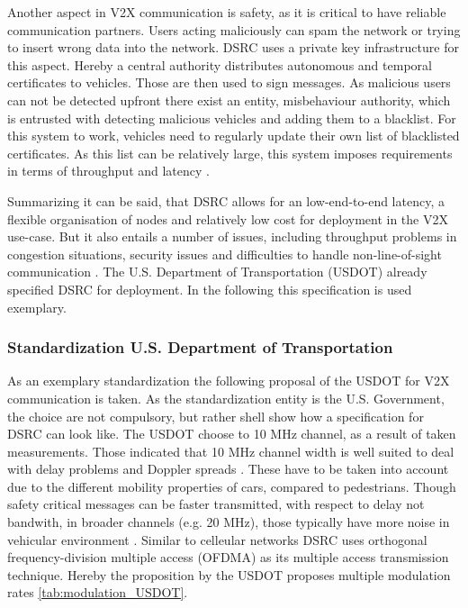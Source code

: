 \documentclass[conference,12pt,onecolumn]{IEEEtran}
\begin{document}
Another aspect in V2X communication is safety, as it is critical to have reliable communication partners. Users acting maliciously can spam the network or trying to insert wrong data into the network. DSRC uses a private key infrastructure for this aspect. Hereby a central authority distributes autonomous and temporal certificates to vehicles. Those are then used to sign messages. As malicious users can not be detected upfront there exist an entity, misbehaviour authority, which is entrusted with detecting malicious vehicles and adding them to a blacklist. For this system to work, vehicles need to regularly update their own list of blacklisted certificates. As this list can be relatively large, this system imposes requirements in terms of throughput and latency \cite{machardy2018}.

Summarizing it can be said, that DSRC allows for an low-end-to-end latency, a flexible organisation of nodes and relatively low cost for deployment in the V2X use-case. But it also entails a number of issues, including throughput problems in congestion situations, security issues and difficulties to handle non-line-of-sight communication \cite{machardy2018}. The U.S. Department of Transportation (USDOT) already specified DSRC for deployment. In the following this specification is used exemplary.

\subsubsection*{Standardization U.S. Department of Transportation}
As an exemplary standardization the following proposal of the USDOT for V2X communication is taken. As the standardization entity is the U.S. Government, the choice are not compulsory, but rather shell show how a specification for DSRC can look like.
The USDOT choose to 10 MHz channel, as a result of taken measurements. Those indicated that 10 MHz channel width is well suited to deal with delay problems and Doppler spreads \cite{kenney2011}. These have to be taken into account due to the different mobility properties of cars, compared to pedestrians.  Though safety critical messages can be faster transmitted, with respect to delay not bandwith, in broader channels (e.g. 20 MHz), those typically have more noise in vehicular environment \cite{kenney2011}.
Similar to celleular networks DSRC uses orthogonal frequency-division multiple access (OFDMA) as its multiple access transmission technique. Hereby the proposition by the USDOT proposes multiple modulation rates \ref{tab:modulation_USDOT}.
\end{document}

